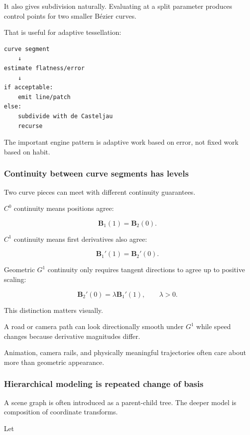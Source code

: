 It also gives subdivision naturally. Evaluating at a split parameter produces control points for two smaller Bézier curves.

That is useful for adaptive tessellation:

\begin{verbatim}
curve segment
    ↓
estimate flatness/error
    ↓
if acceptable:
    emit line/patch
else:
    subdivide with de Casteljau
    recurse
\end{verbatim}

The important engine pattern is adaptive work based on error, not fixed work based on habit.

\subsubsection{Continuity between curve segments has levels}\label{03-visual-computing-i-ch001-continuity-between-curve-segments-has-levels}

Two curve pieces can meet with different continuity guarantees.

\(C^0\) continuity means positions agree:

\[
\mathbf B_1(1)=\mathbf B_2(0).
\]

\(C^1\) continuity means first derivatives also agree:

\[
\mathbf B_1'(1)=\mathbf B_2'(0).
\]

Geometric \(G^1\) continuity only requires tangent directions to agree up to positive scaling:

\[
\mathbf B_2'(0)=\lambda\mathbf B_1'(1),
\qquad
\lambda>0.
\]

This distinction matters visually.

A road or camera path can look directionally smooth under \(G^1\) while speed changes because derivative magnitudes differ.

Animation, camera rails, and physically meaningful trajectories often care about more than geometric appearance.

\subsubsection{Hierarchical modeling is repeated change of basis}\label{03-visual-computing-i-ch001-hierarchical-modeling-is-repeated-change-of-basis}

A scene graph is often introduced as a parent-child tree. The deeper model is composition of coordinate transforms.

Let

